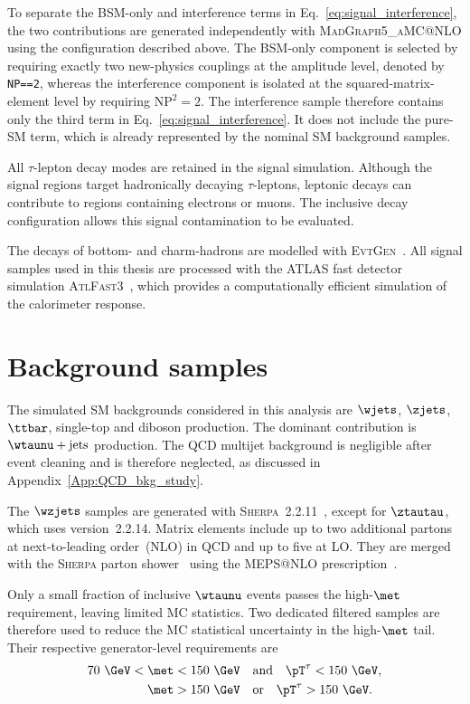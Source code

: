 To separate the BSM-only and interference terms in Eq.~\eqref{eq:signal_interference}, the two contributions are generated independently with \textsc{MadGraph5\_aMC@NLO} using the configuration described above.
The BSM-only component is selected by requiring exactly two new-physics couplings at the amplitude level, denoted by \texttt{NP==2}, whereas the interference component is isolated at the squared-matrix-element level by requiring $\mathrm{NP}^{2}=2$.
The interference sample therefore contains only the third term in Eq.~\eqref{eq:signal_interference}.
It does not include the pure-SM term, which is already represented by the nominal SM background samples.

All $\tau$-lepton decay modes are retained in the signal simulation.
Although the signal regions target hadronically decaying $\tau$-leptons, leptonic decays can contribute to regions containing electrons or muons.
The inclusive decay configuration allows this signal contamination to be evaluated.

The decays of bottom- and charm-hadrons are modelled with \textsc{EvtGen}~\cite{Lange2001EvtGen}.
All signal samples used in this thesis are processed with the ATLAS fast detector simulation \textsc{AtlFast3}~\cite{ATLAS2022AtlFast3}, which provides a computationally efficient simulation of the calorimeter response.

\section{Background samples}
\label{sec:background_samples}

The simulated SM backgrounds considered in this analysis are $\wjets$, $\zjets$, $\ttbar$, single-top and diboson production.
The dominant contribution is $\wtaunu+\mathrm{jets}$ production.
The QCD multijet background is negligible after event cleaning and is therefore neglected, as discussed in Appendix~\ref{App:QCD_bkg_study}.

The $\wzjets$ samples are generated with \textsc{Sherpa}~2.2.11~\cite{Bothmann2019Sherpa22}, except for $\ztautau$, which uses version~2.2.14.
Matrix elements include up to two additional partons at next-to-leading order~(NLO) in QCD and up to five at LO.
They are merged with the \textsc{Sherpa} parton shower~\cite{Schumann2008SherpaPS} using the MEPS@NLO prescription~\cite{Hoche2012MEPSNLO,Hoche2013MEPSNLO,Catani2001MEPS,Hoche2009MEPS}.

Only a small fraction of inclusive $\wtaunu$ events passes the high-$\met$ requirement, leaving limited MC statistics.
Two dedicated filtered samples are therefore used to reduce the MC statistical uncertainty in the high-$\met$ tail.
Their respective generator-level requirements are
\begin{align}
    70~\GeV < \met < 150~\GeV
    &\quad\mathrm{and}\quad
    \pT^{\tau} < 150~\GeV, \notag\\
    \met > 150~\GeV
    &\quad\mathrm{or}\quad
    \pT^{\tau} > 150~\GeV.
\end{align}

